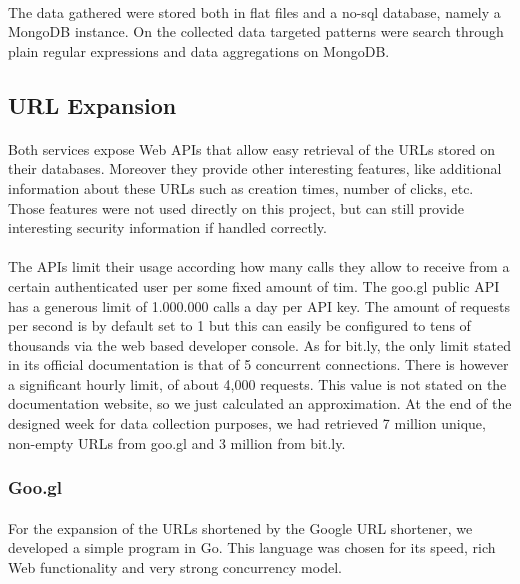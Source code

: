\documentclass[12pt]{article}
\begin{document}
\paragraph{}
The data gathered were stored both in flat files and a no-sql database, namely a MongoDB instance. On the collected data targeted patterns were search through plain regular expressions and data aggregations on MongoDB. 

\subsection{URL Expansion}

\paragraph{}
Both services expose Web APIs that allow easy retrieval of the URLs stored on their databases. Moreover they provide other interesting features, like additional information about these URLs such as creation times, number of clicks, etc. Those features were not used directly on this project, but can still provide interesting security information if handled correctly. 

\paragraph{}
The APIs limit their usage according how many calls they allow to receive from a certain authenticated user per some fixed amount of tim. The goo.gl public API has a generous limit of 1.000.000 calls a day per API key. The amount of requests per second is by default set to 1 but this can easily be configured to tens of thousands via the web based developer console. As for bit.ly, the only limit stated in its official documentation is that of 5 concurrent connections. There is however a significant hourly limit, of  about 4,000 requests. This value is not stated on the documentation website, so we just calculated an approximation. At the end of the designed week for data collection purposes, we had retrieved 7 million unique, non-empty URLs from goo.gl and 3 million from bit.ly.

\subsubsection{Goo.gl}
\paragraph{}
For the expansion of the URLs shortened by the Google URL shortener, we developed a simple program in Go. This language was chosen for its speed, rich Web functionality and very strong concurrency model. 
\end{document}
